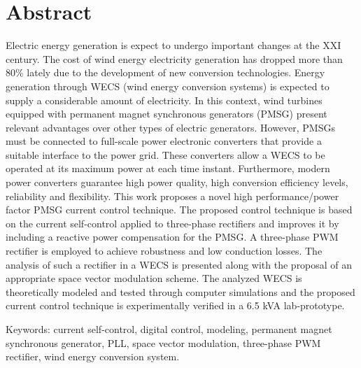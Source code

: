 \chapter*{Abstract}

Electric energy generation is expect to undergo important changes at
the XXI century. The cost of wind energy electricity generation has
dropped more than 80\% lately due to the development of new conversion
technologies. Energy generation through WECS (wind energy conversion
systems) is expected to supply a considerable amount of electricity.
In this context, wind turbines equipped with permanent magnet
synchronous generators (PMSG) present relevant advantages over other
types of electric generators. However, PMSGs must be connected to
full-scale power electronic converters that provide a suitable
interface to the power grid. 
These converters allow a WECS to be operated at its maximum power at each time instant. Furthermore,
modern power converters guarantee high power quality, high conversion
efficiency levels, reliability and flexibility. 
This work proposes a novel high performance/power factor PMSG current control technique.
The proposed control technique is based on the current self-control
applied to three-phase rectifiers and improves it by including a
reactive power compensation for the PMSG. 
A three-phase PWM rectifier is employed to achieve robustness and low conduction losses. The
analysis of such a rectifier in a WECS is presented along with the
proposal of an appropriate space vector modulation scheme. 
The analyzed WECS is theoretically modeled and tested through computer
simulations and the proposed current control technique is
experimentally verified in a 6.5 kVA lab-prototype.

\vspace{5mm}

\begin{flushleft}

Keywords: current self-control, digital control, modeling, permanent magnet synchronous generator, PLL, space
vector modulation, three-phase PWM rectifier, wind energy
conversion system.

\end{flushleft}